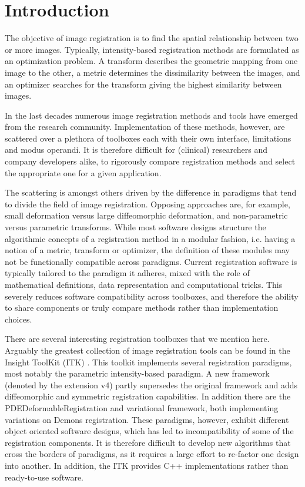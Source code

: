 \section{Introduction}
\label{sec:introduction}

The objective of image registration is to find the spatial
relationship between two or more images. Typically, intensity-based
registration methods are formulated as an optimization problem. A
transform describes the geometric mapping from one image to the
other, a metric determines the dissimilarity between the images, and
an optimizer searches for the transform giving the highest
similarity between images.

In the last decades numerous image registration methods and tools
have emerged from the research community. Implementation of these
methods, however, are scattered over a plethora of toolboxes each
with their own interface, limitations and modus operandi. It is
therefore difficult for (clinical) researchers and company
developers alike, to rigorously compare registration methods and
select the appropriate one for a given application.

The scattering is amongst others driven by the difference in
paradigms that tend to divide the field of image registration.
Opposing approaches are, for example, small deformation versus large diffeomorphic
deformation, and non-parametric versus parametric transforms. While
most software designs structure the algorithmic concepts of a
registration method in a modular fashion, i.e. having a notion of a
metric, transform or optimizer, the definition of these modules may
not be functionally compatible across paradigms. Current
registration software is typically tailored to the paradigm it
adheres, mixed with the role of mathematical definitions, data
representation and computational tricks. This severely reduces
software compatibility across toolboxes, and therefore the ability
to share components or truly compare methods rather than
implementation choices.

There are several interesting registration toolboxes that we mention
here. Arguably the greatest collection of image registration tools
can be found in the Insight ToolKit (ITK) \cite{itk}. This toolkit
implements several registration paradigms, 
most notably the parametric
intensity-based paradigm. A new framework (denoted by the extension
v4) partly supersedes the original framework and adds diffeomorphic and symmetric
registration capabilities. In addition there are the
PDEDeformableRegistration and variational framework, both implementing variations on Demons registration.
 These
paradigms, however, exhibit different object oriented software
designs, which has led to incompatibility of some of the
registration components. It is therefore difficult to develop new
algorithms that cross the borders of paradigms, as it requires a
large effort to re-factor one design into another. In addition, the
ITK provides C++ implementations rather than ready-to-use software.

